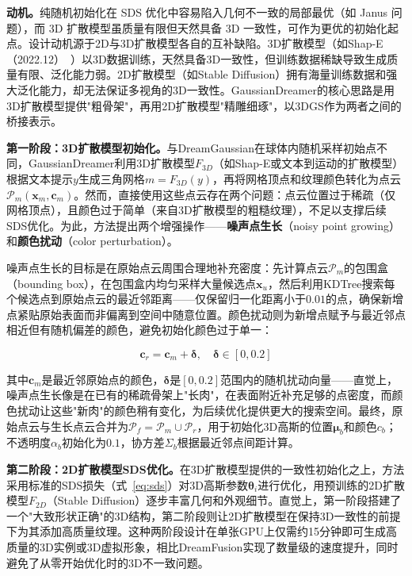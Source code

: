 \textbf{动机。}纯随机初始化在 SDS 优化中容易陷入几何不一致的局部最优（如 Janus 问题），而 3D 扩散模型虽质量有限但天然具备 3D 一致性，可作为更优的初始化起点。设计动机源于2D与3D扩散模型各自的互补缺陷。3D扩散模型（如Shap-E（2022.12）~\cite{2212_02624}）以3D数据训练，天然具备3D一致性，但训练数据稀缺导致生成质量有限、泛化能力弱。2D扩散模型（如Stable Diffusion）拥有海量训练数据和强大泛化能力，却无法保证多视角的3D一致性。GaussianDreamer的核心思路是用3D扩散模型提供"粗骨架"，再用2D扩散模型"精雕细琢"，以3DGS作为两者之间的桥接表示。

\textbf{第一阶段：3D扩散模型初始化。}与DreamGaussian在球体内随机采样初始点不同，GaussianDreamer利用3D扩散模型$F_{3D}$（如Shap-E或文本到运动的扩散模型）根据文本提示$y$生成三角网格$m = F_{3D}(y)$，再将网格顶点和纹理颜色转化为点云$\mathcal{P}_m(\mathbf{x}_m, \mathbf{c}_m)$。然而，直接使用这些点云存在两个问题：点云位置过于稀疏（仅网格顶点），且颜色过于简单（来自3D扩散模型的粗糙纹理），不足以支撑后续SDS优化。为此，方法提出两个增强操作——\textbf{噪声点生长}（noisy point growing）和\textbf{颜色扰动}（color perturbation）。

噪声点生长的目标是在原始点云周围合理地补充密度：先计算点云$\mathcal{P}_m$的包围盒（bounding box），在包围盒内均匀采样大量候选点$\mathbf{x}_u$，然后利用KDTree搜索每个候选点到原始点云的最近邻距离——仅保留归一化距离小于$0.01$的点，确保新增点紧贴原始表面而非偏离到空间中随意位置。颜色扰动则为新增点赋予与最近邻点相近但有随机偏差的颜色，避免初始化颜色过于单一：

\begin{equation}
\mathbf{c}_r = \mathbf{c}_m + \boldsymbol{\delta}, \quad \boldsymbol{\delta} \in [0, 0.2]
\end{equation}

其中$\mathbf{c}_m$是最近邻原始点的颜色，$\boldsymbol{\delta}$是$[0, 0.2]$范围内的随机扰动向量——直觉上，噪声点生长像是在已有的稀疏骨架上"长肉"，在表面附近补充足够的点密度，而颜色扰动让这些"新肉"的颜色稍有变化，为后续优化提供更大的搜索空间。最终，原始点云与生长点云合并为$\mathcal{P}_f = \mathcal{P}_m \cup \mathcal{P}_r$，用于初始化3D高斯的位置$\boldsymbol{\mu}_b$和颜色$c_b$；不透明度$\alpha_b$初始化为$0.1$，协方差$\Sigma_b$根据最近邻点间距计算。

\textbf{第二阶段：2D扩散模型SDS优化。}在3D扩散模型提供的一致性初始化之上，方法采用标准的SDS损失（式~\ref{eq:sds}）对3D高斯参数$\boldsymbol{\theta}_i$进行优化，用预训练的2D扩散模型$F_{2D}$（Stable Diffusion）逐步丰富几何和外观细节。直觉上，第一阶段搭建了一个"大致形状正确"的3D结构，第二阶段则让2D扩散模型在保持3D一致性的前提下为其添加高质量纹理。这种两阶段设计在单张GPU上仅需约15分钟即可生成高质量的3D实例或3D虚拟形象，相比DreamFusion实现了数量级的速度提升，同时避免了从零开始优化时的3D不一致问题。

